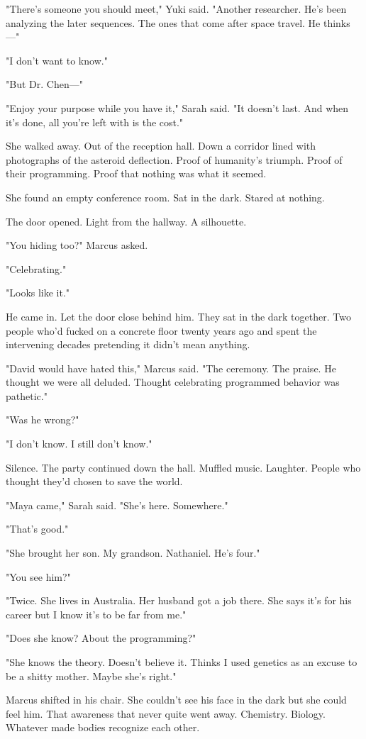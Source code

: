 "There's someone you should meet," Yuki said. "Another researcher. He's been analyzing the later sequences. The ones that come after space travel. He thinks—"

"I don't want to know."

"But Dr. Chen—"

"Enjoy your purpose while you have it," Sarah said. "It doesn't last. And when it's done, all you're left with is the cost."

She walked away. Out of the reception hall. Down a corridor lined with photographs of the asteroid deflection. Proof of humanity's triumph. Proof of their programming. Proof that nothing was what it seemed.

She found an empty conference room. Sat in the dark. Stared at nothing.

The door opened. Light from the hallway. A silhouette.

"You hiding too?" Marcus asked.

"Celebrating."

"Looks like it."

He came in. Let the door close behind him. They sat in the dark together. Two people who'd fucked on a concrete floor twenty years ago and spent the intervening decades pretending it didn't mean anything.

"David would have hated this," Marcus said. "The ceremony. The praise. He thought we were all deluded. Thought celebrating programmed behavior was pathetic."

"Was he wrong?"

"I don't know. I still don't know."

Silence. The party continued down the hall. Muffled music. Laughter. People who thought they'd chosen to save the world.

"Maya came," Sarah said. "She's here. Somewhere."

"That's good."

"She brought her son. My grandson. Nathaniel. He's four."

"You see him?"

"Twice. She lives in Australia. Her husband got a job there. She says it's for his career but I know it's to be far from me."

"Does she know? About the programming?"

"She knows the theory. Doesn't believe it. Thinks I used genetics as an excuse to be a shitty mother. Maybe she's right."

Marcus shifted in his chair. She couldn't see his face in the dark but she could feel him. That awareness that never quite went away. Chemistry. Biology. Whatever made bodies recognize each other.

